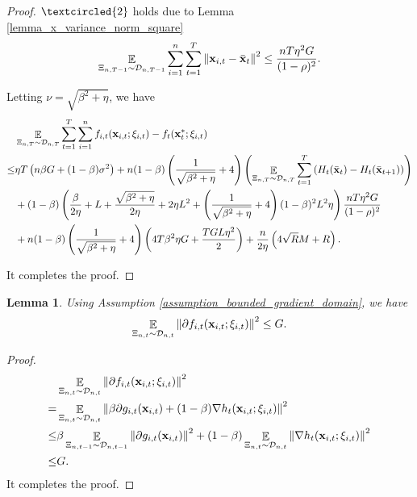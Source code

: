 \documentclass{article}
\newtheorem{Lemma}{\bf{Lemma}}
\begin{document}
\begin{proof}
$\textcircled{2}$ holds due to Lemma \ref{lemma_x_variance_norm_square}
\begin{align}
\nonumber
\mathop{\mathbb{E}}_{ \Xi_{n,T-1} \sim \mathcal{D}_{n,T-1} } \sum_{i=1}^n\sum_{t=1}^T \left\lVert{\bf x}_{i,t} - \bar{{\bf x}}_t\right\rVert^2 \le \frac{nT\eta^2 G }{(1-\rho)^2}.
\end{align}





Letting $\nu = \sqrt{\beta^2 + \eta}$, we have
\begin{align}
\nonumber
& \mathop{\mathbb{E}}_{ \Xi_{n,T} \sim \mathcal{D}_{n,T} } \sum_{t=1}^T\sum_{i=1}^n f_{i,t}({\bf x}_{i,t};\xi_{i,t}) - f_t({\bf x}_t^\ast;\xi_{i,t}) \\ \nonumber
\le & \eta T \left(  n\beta G + (1-\beta)\sigma^2 \right) + n(1-\beta)\left(  \frac{1}{\sqrt{\beta^2 + \eta}} + 4  \right) \left(  \mathop{\mathbb{E}}_{ \Xi_{n,T} \sim \mathcal{D}_{n,T} } \sum_{t=1}^T  \left( H_t(\bar{{\bf x}}_t) - H_t(\bar{{\bf x}}_{t+1}) \right)   \right) \\ \nonumber
& + (1-\beta)\left( \frac{\beta}{2\eta } +L + \frac{\sqrt{\beta^2 + \eta}}{2\eta} + 2\eta L^2  + \left( \frac{1}{\sqrt{\beta^2 + \eta}} + 4 \right)(1-\beta)^2L^2 \eta \right)  \frac{nT\eta^2 G }{(1-\rho)^2}  \\ \nonumber
& + n(1-\beta)\left(  \frac{1}{\sqrt{\beta^2 + \eta}} + 4  \right) \left(  4T\beta^2 \eta G + \frac{TGL\eta^2}{2}  \right)  + \frac{n}{2\eta}\left(  4\sqrt{R}M + R   \right).
\end{align}



It completes the proof.



\end{proof}


\begin{Lemma}
\label{lemma_stochastic_gradient_norm_bound}
Using Assumption \ref{assumption_bounded_gradient_domain}, we have
\begin{align}
\nonumber
\mathop{\mathbb{E}}_{ \Xi_{n,t} \sim \mathcal{D}_{n,t} }\left\lVert \partial f_{i,t}({\bf x}_{i,t};\xi_{i,t})\right\rVert^2 \le G.
\end{align}


\end{Lemma}
\begin{proof}

\begin{align}
\nonumber
& \mathop{\mathbb{E}}_{ \Xi_{n,t} \sim \mathcal{D}_{n,t} }\left\lVert \partial f_{i,t}({\bf x}_{i,t};\xi_{i,t})\right\rVert^2 \\ \nonumber 
= & \mathop{\mathbb{E}}_{ \Xi_{n,t} \sim \mathcal{D}_{n,t} }\left\lVert \beta \partial g_{i,t}({\bf x}_{i,t}) + (1-\beta)\nabla h_t({\bf x}_{i,t};\xi_{i,t})\right\rVert^2 \\ \nonumber 
\le &  \beta \mathop{\mathbb{E}}_{ \Xi_{n,t-1} \sim \mathcal{D}_{n,t-1} }\left\lVert \partial g_{i,t}({\bf x}_{i,t}) \right\rVert^2 + (1-\beta) \mathop{\mathbb{E}}_{ \Xi_{n,t} \sim \mathcal{D}_{n,t} } \left\lVert \nabla h_t({\bf x}_{i,t};\xi_{i,t}) \right\rVert^2 \\ \nonumber 
\le & G.
\end{align} It completes the proof.
\end{proof}
\end{document}
